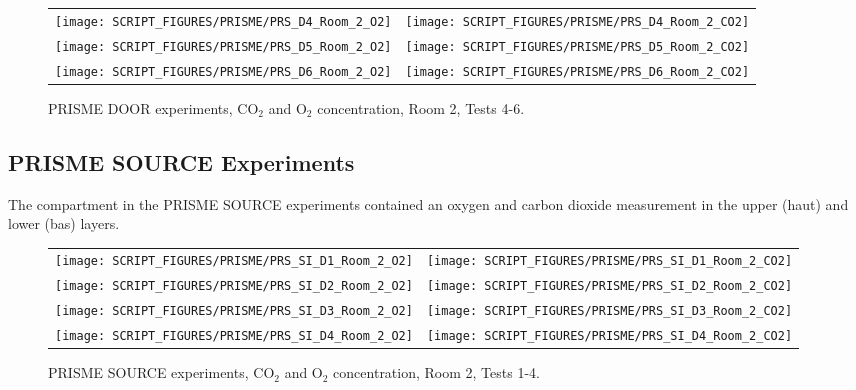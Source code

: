 \begin{figure}[p]
\begin{tabular*}{\textwidth}{l@{\extracolsep{\fill}}r}
\texttt{[image: SCRIPT\_FIGURES/PRISME/PRS\_D4\_Room\_2\_O2]} &
\texttt{[image: SCRIPT\_FIGURES/PRISME/PRS\_D4\_Room\_2\_CO2]} \\
\texttt{[image: SCRIPT\_FIGURES/PRISME/PRS\_D5\_Room\_2\_O2]} &
\texttt{[image: SCRIPT\_FIGURES/PRISME/PRS\_D5\_Room\_2\_CO2]} \\
\texttt{[image: SCRIPT\_FIGURES/PRISME/PRS\_D6\_Room\_2\_O2]} &
\texttt{[image: SCRIPT\_FIGURES/PRISME/PRS\_D6\_Room\_2\_CO2]}
\end{tabular*}
\caption[PRISME DOOR experiments, CO$_2$ and O$_2$ concentration, Room 2, Tests 4-6]{PRISME DOOR experiments, CO$_2$ and O$_2$ concentration, Room 2, Tests 4-6.}
\label{PRISME_Gas_4}
\end{figure}

\clearpage

\subsection{PRISME SOURCE Experiments}

The compartment in the PRISME SOURCE experiments contained an oxygen and carbon dioxide measurement in the upper (haut) and lower (bas) layers.

\begin{figure}[!ht]
\begin{tabular*}{\textwidth}{l@{\extracolsep{\fill}}r}
\texttt{[image: SCRIPT\_FIGURES/PRISME/PRS\_SI\_D1\_Room\_2\_O2]} &
\texttt{[image: SCRIPT\_FIGURES/PRISME/PRS\_SI\_D1\_Room\_2\_CO2]} \\
\texttt{[image: SCRIPT\_FIGURES/PRISME/PRS\_SI\_D2\_Room\_2\_O2]} &
\texttt{[image: SCRIPT\_FIGURES/PRISME/PRS\_SI\_D2\_Room\_2\_CO2]} \\
\texttt{[image: SCRIPT\_FIGURES/PRISME/PRS\_SI\_D3\_Room\_2\_O2]} &
\texttt{[image: SCRIPT\_FIGURES/PRISME/PRS\_SI\_D3\_Room\_2\_CO2]} \\
\texttt{[image: SCRIPT\_FIGURES/PRISME/PRS\_SI\_D4\_Room\_2\_O2]} &
\texttt{[image: SCRIPT\_FIGURES/PRISME/PRS\_SI\_D4\_Room\_2\_CO2]}
\end{tabular*}
\caption[PRISME SOURCE experiments, CO$_2$ and O$_2$ concentration, Room 2, Tests 1-4]{PRISME SOURCE experiments, CO$_2$ and O$_2$ concentration, Room 2, Tests 1-4.}
\label{PRISME_SOURCE_Gas_1}
\end{figure}

